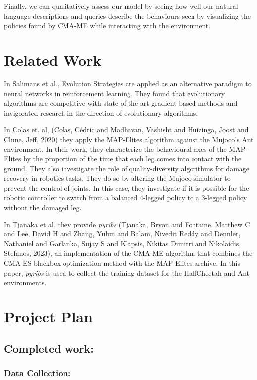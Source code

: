 \documentclass[11pt]{article}
\begin{document}
Finally, we can qualitatively assess our model by seeing how well our natural language descriptions
and queries describe the behaviours seen by visualizing the policies found by CMA-ME while
interacting with the environment.

\section{Related Work}
\label{sec:org420998d}

In Salimans et al., Evolution Strategies are applied as an alternative paradigm to neural networks
in reinforcement learning. They found that evolutionary algorithms are competitive with state-of-the-art
gradient-based methods and invigorated research in the direction of evolutionary algorithms. 

In Colas et. al, (Colas, Cédric and Madhavan, Vashisht and Huizinga, Joost and Clune, Jeff, 2020) they apply the MAP-Elites algorithm against the Mujoco's Ant environment. In their work,
they characterize the behavioural axes of the MAP-Elites by the proportion of the time that each leg comes into
contact with the ground. They also investigate the role of quality-diversity algorithms for damage recovery in robotics tasks.
They do so by altering the Mujoco simulator to prevent the control of joints. In this case, they investigate
if it is possible for the robotic controller to switch from a balanced 4-legged policy to a 3-legged policy
without the damaged leg.

In Tjanaka et al, they provide \emph{pyribs} (Tjanaka, Bryon and Fontaine, Matthew C and Lee, David H and Zhang, Yulun and Balam, Nivedit Reddy and Dennler, Nathaniel and Garlanka, Sujay S and Klapsis, Nikitas Dimitri and Nikolaidis, Stefanos, 2023), an implementation of the CMA-ME algorithm that combines the CMA-ES blackbox optimization method with
the MAP-Elites archive. In this paper, \emph{pyribs} is used to collect the training dataset for the HalfCheetah and Ant environments.


\section{Project Plan}
\label{sec:orgff40dab}

\subsection{Completed work:}
\label{sec:orgb820148}

\subsubsection{Data Collection:}
\label{sec:orga576507}
\end{document}
